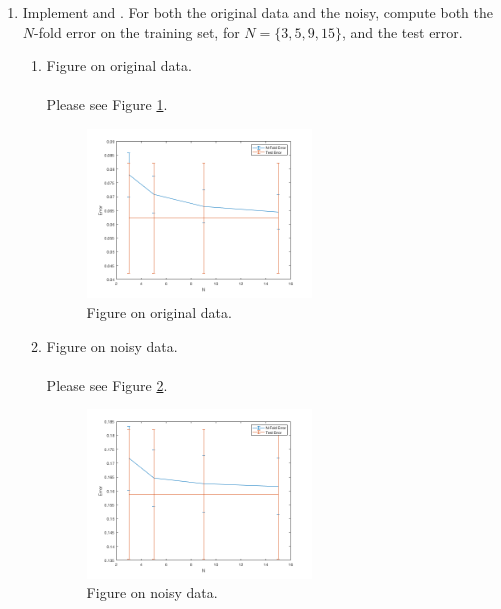 \documentclass[english]{article}
\begin{document}
\begin{enumerate}[label=(\roman*)]
\begin{enumerate}
      \item Implement  and . For both the original data and the noisy, compute both the $N$-fold error on the training set, for $N = \{3,5,9,15\}$, and the test error.
      \begin{enumerate}
        \item Figure on original data.\\ \\
        Please see Figure \ref{fig:331}. \\
        \begin{figure}[H]
          \centering
          \includegraphics[width=0.6\textwidth]{331.png}
          \caption{Figure on original data.}
          \label{fig:331}
        \end{figure}
        \item Figure on noisy data.\\ \\
        Please see Figure \ref{fig:332}. \\
        \begin{figure}[H]
          \centering
          \includegraphics[width=0.6\textwidth]{332.png}
          \caption{Figure on noisy data.}
          \label{fig:332}
        \end{figure}
      \end{enumerate}

    \end{enumerate}

\end{enumerate}
\end{document}
